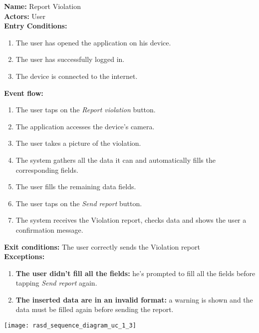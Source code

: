\begin{usecase}{1.3}
    \textbf{Name: }Report Violation \\
    \textbf{Actors: } User \\
    \textbf{Entry Conditions:}
    \begin{enumerate}
        \item The user has opened the application on his device.
        \item The user has successfully logged in.
        \item The device is connected to the internet.
    \end{enumerate}
    \textbf{Event flow:}
    \begin{enumerate}
        \item The user taps on the \emph{Report violation} button.
        \item The application accesses the device's camera.
        \item The user takes a picture of the violation.
        \item The system gathers all the data it can and automatically fills the
        corresponding fields.
        \item The user fills the remaining data fields.
        \item The user taps on the \emph{Send report} button.
        \item The system receives the Violation report, checks data and shows
        the user a confirmation message.
    \end{enumerate}
    \textbf{Exit conditions: } The user correctly sends the Violation report \\
    \textbf{Exceptions: }
    \begin{enumerate}
        \item \textbf{The user didn't fill all the fields:} he's prompted to
        fill all the fields before tapping \emph{Send report} again.
        \item \textbf{The inserted data are in an invalid format:} a warning is
        shown and the data must be filled again before sending the report.
    \end{enumerate}
    \tcblower
    \centering
    \texttt{[image: rasd\_sequence\_diagram\_uc\_1\_3]}
\end{usecase}